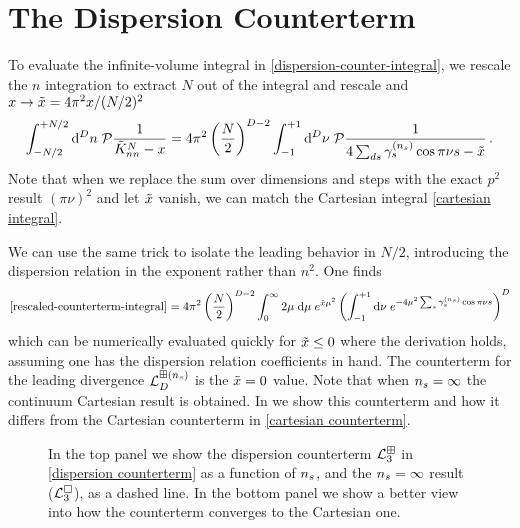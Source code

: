 \section{The Dispersion Counterterm}
\label{sec:dispersion-counterterm}

To evaluate the infinite-volume integral in \eqref{dispersion-counter-integral}, we rescale the $n$ integration to extract $N$ out of the integral and rescale and $x \to \tilde{x} = 4 \pi^2  x/(N/2)^2$
\begin{equation}\label{eq:rescaled-counterterm-integral}
    \int_{-N/2}^{+N/2} \mathrm{d}^Dn\; \mathcal{P} \frac{1}{\tilde K_{nn}^N - x}
    =
    4\pi^2 \left(\frac{N}{2}\right)^{D-2} \int_{-1}^{+1} \mathrm{d}^D\nu\; \mathcal{P} \frac{1}{4\sum_{ds} \gamma^{({n_s})}_s \cos \pi \nu s - \tilde{x}}
    \, .
\end{equation}
Note that when we replace the sum over dimensions and steps with the exact $p^2$ result $(\pi \nu)^2$ and let $\tilde{x}$ vanish, we can match the Cartesian integral \eqref{cartesian integral}.

We can use the same trick to isolate the leading behavior in $N/2$, introducing the dispersion relation in the exponent rather than $n^2$.
One finds
\begin{equation}
    \label{eq:dispersion counterterm}
    \eqref{rescaled-counterterm-integral}
    =
    4 \pi^2 \left(\frac{N}{2}\right)^{D-2}\int_{0}^{\infty} 2\mu\; \mathrm{d}\mu\; e^{\xtilde\mu^2}\left(\int_{-1}^{+1} \mathrm{d}\nu\; e^{-4\mu^2 \sum_s \gamma_s^{(\nstep)} \cos \pi \nu s}\right)^D
\end{equation}
which can be numerically evaluated quickly for $\tilde{x}\leq0$ where the derivation holds, assuming one has the dispersion relation coefficients in hand.
The counterterm for the leading divergence $\mathcal{L}_D^{\boxplus ({n_s})}$ is the $\tilde{x}=0$ value.
Note that when ${n_s}=\infty$ the continuum Cartesian result is obtained.
In  we show this counterterm and how it differs from the Cartesian counterterm in \eqref{cartesian counterterm}.



\begin{figure}[htb]
    
    \caption{
    	In the top panel we show the dispersion counterterm $\mathcal{L}^{\boxplus}_{3}$ in \eqref{dispersion counterterm} as a function of ${n_s}$, and the ${n_s}=\infty$ result ($\mathcal{L}^{\square}_3$), as a dashed line.
	In the bottom panel we show a better view into how the counterterm converges to the Cartesian one.
    }
    \label{fig:nstep counterterm}
\end{figure}
